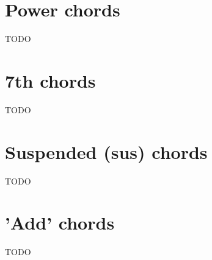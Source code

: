 \section{Power chords}
TODO

\section{7th chords}
TODO

\section{Suspended (sus) chords}
TODO

\section{'Add' chords}
TODO